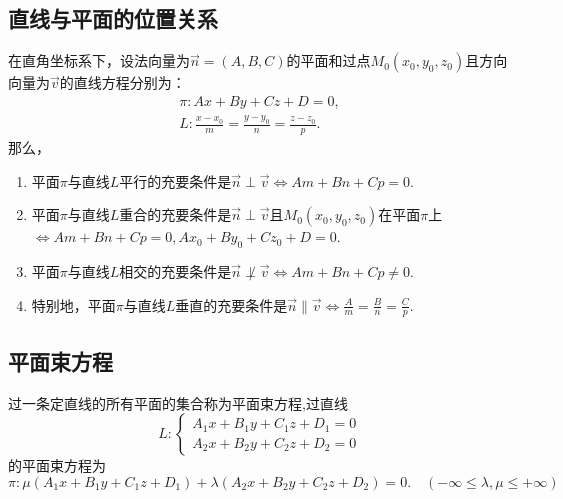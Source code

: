 \subsection{直线与平面的位置关系}
\ttheorem[直线与平面的位置关系]
\quad 在{\color{dy}直角坐标系}下，设法向量为$\overrightarrow{n}=(A,B,C)$的平面和过点$M_0(x_0,y_0,z_0)$且方向向量为$\overrightarrow{v}$的直线方程分别为：
\begin{equation*}
\begin{array}{c}
\pi:Ax+By+Cz+D=0,\\
\displaystyle L:\frac{x-x_0}{m}=\frac{y-y_0}{n}=\frac{z-z_0}{p}.
\end{array}
\end{equation*}
那么，
\begin{enumerate}[$\mathrm (1)$]
	\setlength{\itemindent}{3em}
	\setlength{\topsep}{0.01em}
	\setlength{\itemsep}{0.01em}
	\item  平面$\pi $与直线$L$平行的充要条件是$\overrightarrow{n} \perp \overrightarrow{v} \Leftrightarrow Am+Bn+Cp=0.$
	\item  平面$\pi $与直线$L$重合的充要条件是$\overrightarrow{n}  \perp \overrightarrow{v}$且$M_0(x_0,y_0,z_0)$在平面$\pi $上$\Leftrightarrow Am+Bn+Cp=0,Ax_0+By_0+Cz_0+D=0.$
	\item  平面$\pi $与直线$L$相交的充要条件是$\overrightarrow{n}  \not \perp \overrightarrow{v} \Leftrightarrow Am+Bn+Cp \neq 0.$
	\item  特别地，平面$\pi $与直线$L$垂直的充要条件是$\overrightarrow{n} \parallel  \overrightarrow{v} \Leftrightarrow \displaystyle \frac{A}{m}=\frac{B}{n}=\frac{C}{p}.$
\end{enumerate}



\subsection{平面束方程}
\tdefination[定线平面束]
过一条定直线的所有平面的集合称为{\color{dy}平面束方程},过直线
\begin{equation*}
L:
\begin{cases}
A_1x+B_1y+C_1z+D_1=0\\
A_2x+B_2y+C_2z+D_2=0
\end{cases}
\end{equation*}
的平面束方程为
\begin{equation}
\pi:\mu \left( A_1x+B_1y+C_1z+D_1\right) +\lambda \left( A_2x+B_2y+C_2z+D_2\right)=0.\quad (-\infty \leq \lambda ,\mu \leq +\infty)
\end{equation}


